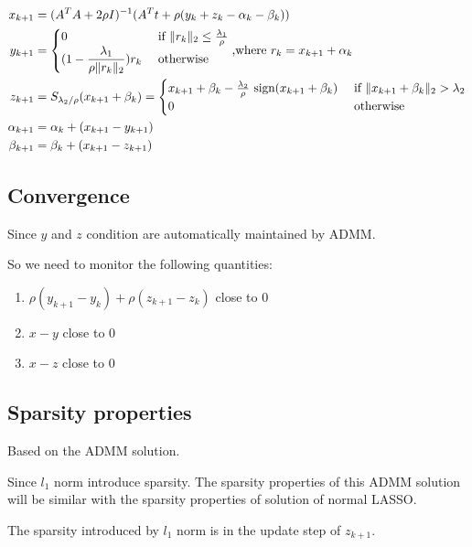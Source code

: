 \documentclass{amsart}
\DeclarePairedDelimiter\norm{\lVert}{\rVert}%
\begin{document}
\begin{align*}
	x_{k+1} &= (A^TA+ 2\rho I)^{-1}( A^Tt + \rho (y_{k}+z_{k}-\alpha_{k}-\beta_{k}))\\
	y_{k+1} &= \begin{cases}
	0 & \text{ if }\norm{r_k}_2 \le \frac{\lambda_1}{\rho}\\
	(1-\dfrac{\lambda_1}{\rho \norm{r_k}_2})r_k & \text{ otherwise}
	\end{cases} \text{,where } r_k=x_{k+1} + \alpha_k\\
	z_{k+1} &= S_{\lambda_2/\rho}(x_{k+1} + \beta_k) = \begin{cases}
	x_{k+1} + \beta_k - \frac{\lambda_2}{\rho} \text{ sign}(x_{k+1} + \beta_k)& \text{ if }\norm{x_{k+1} + \beta_k}_2 > \lambda_2\\
	0 & \text{ otherwise}
	\end{cases}\\
	\alpha_{k+1} &= \alpha_k + (x_{k+1} - y_{k+1})\\
	\beta_{k+1} &= \beta_k + (x_{k+1} - z_{k+1})
\end{align*}

\subsection{Convergence}

Since $y$ and $z$ condition are automatically maintained by ADMM.

So we need to monitor the following quantities:
\begin{enumerate}
	\item $\rho(y_{k+1}-y_{k}) + \rho(z_{k+1}-z_k)$ close to 0
	\item $x-y$ close to 0
	\item $x-z$ close to 0
\end{enumerate}

\subsection{Sparsity properties} Based on the ADMM solution.

Since $l_1$ norm introduce sparsity. The sparsity properties of this ADMM solution will be similar with the sparsity properties of solution of normal LASSO.

The sparsity introduced by $l_1$ norm is in the update step of $z_{k+1}$.
\end{document}
